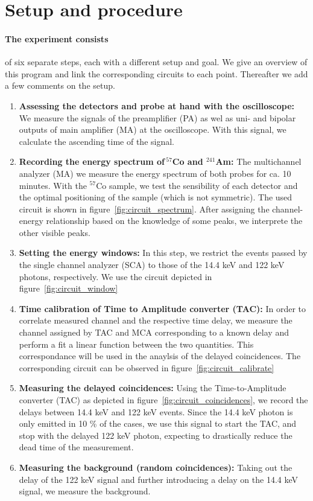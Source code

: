 \section{Setup and procedure}
\paragraph{The experiment consists}
of six separate steps, each with a different setup and goal. 
We give an overview of this program and link the corresponding circuits to 
each point. Thereafter we add a few comments on the setup. 
\begin{enumerate}
    \item 
        \textbf{Assessing the detectors and probe at hand with the oscilloscope:}
        We measure the signals of the preamplifier (PA) as wel as uni- and bipolar outputs of 
        main amplifier (MA) at the oscilloscope. With this signal, we calculate the ascending time 
        of the signal.
    \item 
        \label{it:task2}
        \textbf{Recording the energy spectrum of$\, ^{57}$Co and $^{241}$Am:}
        The multichannel analyzer (MA) we measure the energy spectrum of both probes 
        for ca. 10 minutes. With the $^{57}$Co sample, we test the sensibility of each detector
        and the optimal positioning of the sample (which is not symmetric). 
        The used circuit is shown in figure~\ref{fig:circuit_spectrum}. After assigning the 
        channel-energy relationship based on the knowledge of some peaks, we interprete the other visible peaks.
    \item
        \textbf{Setting the energy windows:}
        In this step, we restrict the events passed by the single channel analyzer (SCA) to those 
        of the 14.4 keV and 122 keV photons, respectively. We use the circuit depicted in figure~\ref{fig:circuit_window}
    \item
        \textbf{Time calibration of Time to Amplitude converter (TAC):}
        In order to correlate measured channel and the respective time delay, we measure the channel 
        assigned by TAC and MCA corresponding to a known delay and perform a fit a linear function between 
        the two quantities. This correspondance will be used in the anaylsis of the delayed coincidences. 
        The corresponding circuit can be observed in figure~\ref{fig:circuit_calibrate}
    \item
        \textbf{Measuring the delayed coincidences:}
        Using the Time-to-Amplitude converter (TAC) as depicted in figure~\ref{fig:circuit_coincidences}, 
        we record the delays between 14.4 keV and 122 keV 
        events. Since the 14.4 keV photon is only emitted in 10 \% of the cases, we use this signal to start the 
        TAC, and stop with the delayed 122 keV photon, expecting to drastically reduce the dead time of the 
        measurement.
    \item
        \textbf{Measuring the background (random coincidences):}
        Taking out the delay of the 122 keV signal and further introducing a delay on the 14.4 keV signal, 
        we measure the background. 
\end{enumerate}


